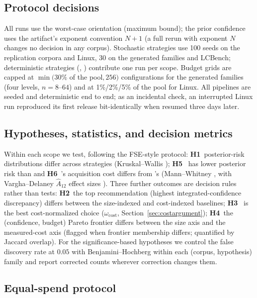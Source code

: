 \subsection{Protocol decisions}
\label{sec:protocol}

All runs use the worst-case orientation (maximum bound); the prior
confidence uses the artifact's exponent convention $N{+}1$ (a full rerun
with exponent $N$ changes no decision in any corpus). Stochastic
strategies use 100 seeds on the replication corpora and Linux, 30 on the
generated families and LCBench; deterministic strategies (\diShe,
\pairwise) contribute one run per scope. Budget grids are capped at $\min(30\%$ of the pool$, 256)$
configurations for the generated families (four levels, $n{=}8$--$64$)
and at 1\%/2\%/5\% of the pool for Linux. All pipelines are seeded and
deterministic end to end; as an incidental check, an interrupted Linux
run reproduced its first release bit-identically when resumed three days
later.

\subsection{Hypotheses, statistics, and decision metrics}
\label{sec:stats}

Within each scope we test, following the FSE-style protocol:
\textbf{H1}~posterior-risk distributions differ across strategies
(Kruskal--Wallis \citep{kruskal1952use});
\textbf{H5}~\srs{} has lower posterior risk than \randomS{} and
\textbf{H6}~\srs's acquisition cost differs from \randomS's
(Mann--Whitney \citep{mann1947test}, with Vargha--Delaney $\hat{A}_{12}$
effect sizes \citep{vargha2000critique}). Three further outcomes are
decision rules rather than tests: \textbf{H2}~the top recommendation
(highest integrated-confidence discrepancy) differs between the
size-indexed and cost-indexed baselines; \textbf{H3}~\srs{} is the best
cost-normalized choice ($\omega_{\mathrm{cost}}$,
Section~\ref{sec:costargument}); \textbf{H4}~the (confidence, budget)
Pareto frontier differs between the size axis and the measured-cost axis
(flagged when frontier membership differs; quantified by Jaccard
overlap). For the significance-based hypotheses we control the false
discovery rate at $0.05$ with Benjamini--Hochberg within each (corpus,
hypothesis) family \citep{benjamini1995controlling} and report corrected
counts wherever correction changes them.

\subsection{Equal-spend protocol}
\label{sec:equalspend}


